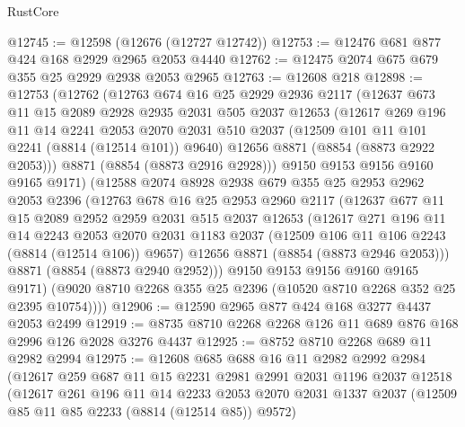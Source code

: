 \begin{lexlean}{RustCore}
\begin{coremodule}
@12745 := @12598 (@12676 (@12727 @12742))
@12753 := @12476 @681 @877 @424 @168 @2929 @2965 @2053 @4440
@12762 := @12475 @2074 @675 @679 @355 @25 @2929 @2938 @2053 @2965
@12763 := @12608 @218
@12898 := @12753
    (@12762
      (@12763
        @674
        @16
        @25
        @2929
        @2936
        @2117
        (@12637
          @673
          @11
          @15
          @2089
          @2928
          @2935
          @2031
          @505
          @2037
          @12653
          (@12617
            @269
            @196
            @11
            @14
            @2241
            @2053
            @2070
            @2031
            @510
            @2037
            (@12509 @101 @11 @101 @2241 (@8814 (@12514 @101)) @9640)
            @12656
            @8871
            (@8854 (@8873 @2922 @2053)))
          @8871
          (@8854 (@8873 @2916 @2928)))
        @9150
        @9153
        @9156
        @9160
        @9165
        @9171)
      (@12588
        @2074
        @8928
        @2938
        @679
        @355
        @25
        @2953
        @2962
        @2053
        @2396
        (@12763
          @678
          @16
          @25
          @2953
          @2960
          @2117
          (@12637
            @677
            @11
            @15
            @2089
            @2952
            @2959
            @2031
            @515
            @2037
            @12653
            (@12617
              @271
              @196
              @11
              @14
              @2243
              @2053
              @2070
              @2031
              @1183
              @2037
              (@12509 @106 @11 @106 @2243 (@8814 (@12514 @106)) @9657)
              @12656
              @8871
              (@8854 (@8873 @2946 @2053)))
            @8871
            (@8854 (@8873 @2940 @2952)))
          @9150
          @9153
          @9156
          @9160
          @9165
          @9171)
        (@9020 @8710 @2268 @355 @25 @2396 (@10520 @8710 @2268 @352 @25 @2395 @10754))))
@12906 := @12590 @2965 @877 @424 @168 @3277 @4437 @2053 @2499
@12919 := @8735 @8710 @2268 @2268 @126 @11 @689 @876 @168 @2996 @126 @2028 @3276 @4437
@12925 := @8752 @8710 @2268 @689 @11 @2982 @2994
@12975 := @12608
    @685
    @688
    @16
    @11
    @2982
    @2992
    @2984
    (@12617
      @259
      @687
      @11
      @15
      @2231
      @2981
      @2991
      @2031
      @1196
      @2037
      @12518
      (@12617
        @261
        @196
        @11
        @14
        @2233
        @2053
        @2070
        @2031
        @1337
        @2037
        (@12509 @85 @11 @85 @2233 (@8814 (@12514 @85)) @9572)

\end{coremodule}
\end{lexlean}
